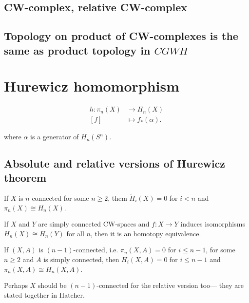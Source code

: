 \begin{remark}
\subsection{CW-complex, relative CW-complex}
\subsection{Topology on product of CW-complexes is the same as product topology in $CGWH$}



\section{Hurewicz homomorphism}
\label{section-Hurewicz-homomorphism}

\begin{definition}
\begin{align*}
h: \pi_{n}(X) &\longrightarrow H_{n}(X) \\
[f] &\longmapsto f_{*}(\alpha)
.\end{align*}
\end{definition}
where $\alpha$ is a generator of $ H_{n}(S^{n})$.

\subsection{Absolute and relative versions of Hurewicz theorem}
\label{subsection-absolute-and-relative-Hurewicz-theorem}

\begin{theorem}[Hurewicz]
\label{theorem-Hurewicz-absolute}
If $X$ is $n$-connected for some $n \geq 2$, them $\tilde{H}_i(X)=0$ for $i<n$
and $\pi_{n}(X)\cong H_n(X)$.
\end{theorem}

\begin{lemma}
\label{lemma-Hurewicz-homomorphism-gives-homotopy-equivalence}
If $X$ and $Y$ are simply connected CW-spaces and  $f:X \to Y$ induces
isomorphisms $H_n(X) \cong H_n(Y)$ for all $n$, then it is an homotopy
equivalence.
\end{lemma}

\begin{theorem}[Hurewicz]
\label{theorem-Hurewicz-relative}
If $(X,A)$ is $(n-1)$-connected, i.e. $\pi_{n}(X,A)=0$ for $i \leq n-1$, for 
some $n\geq 2$ and $A$ is simply connected, then $H_i(X,A)=0$ for $i\leq n-1$ 
and $\pi_{n}(X,A)\cong H_n(X,A)$.
\end{theorem}
Perhaps $X$ should be $(n-1)$-connected for the relative version too---
they are stated together in Hatcher.


\end{remark}
